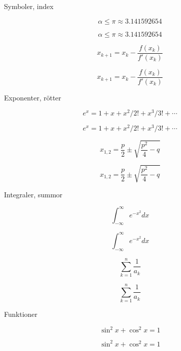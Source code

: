 \begin{Slide}{Symboler, index}

  \begin{exlatex}
\begin{displaymath}
  \alpha \leq \pi \approx 3.141592654
\end{displaymath}
  \end{exlatex}

\begin{displaymath}
  \alpha \leq \pi \approx 3.141592654
\end{displaymath}

  \begin{exlatex}
\[
  x_{k+1} =
  x_{k} -
  \frac{f(x_{k})}{f'(x_{k})}
\]
  \end{exlatex}


\[
  x_{k+1} =
  x_{k} -
  \frac{f(x_{k})}{f'(x_{k})}
\]

\end{Slide}

\begin{Slide}{Exponenter, rötter}

  \begin{exlatex}
\[
  e^x = 1+x+x^2/2!+x^3/3!+\cdots
\]
  \end{exlatex}
\[
  e^x = 1+x+x^2/2!+x^3/3!+\cdots
\]


  \begin{exlatex}
\[
  x_{1,2}=\frac{p}{2}\pm
  \sqrt{\frac{p^2}{4}-q}
\]
  \end{exlatex}
\[
  x_{1,2}=\frac{p}{2}\pm
  \sqrt{\frac{p^2}{4}-q}
\]

\end{Slide}



\begin{Slide}{Integraler, summor}

  \begin{exlatex}
\[
  \int_{-\infty}^{\infty}
  e^{-x^2} dx
\]
  \end{exlatex}
\[
  \int_{-\infty}^{\infty}
  e^{-x^2} dx
\]


  \begin{exlatex}
\[
  \sum_{k=1}^n\frac{1}{a_k}
\]
  \end{exlatex}
\[
  \sum_{k=1}^n\frac{1}{a_k}
\]

\end{Slide}

\begin{Slide}{Funktioner}

  \begin{exlatex}
\[
  \sin^2 x + \cos^2 x = 1
\]
  \end{exlatex}
\[
  \sin^2 x + \cos^2 x = 1
\]

\end{Slide}

